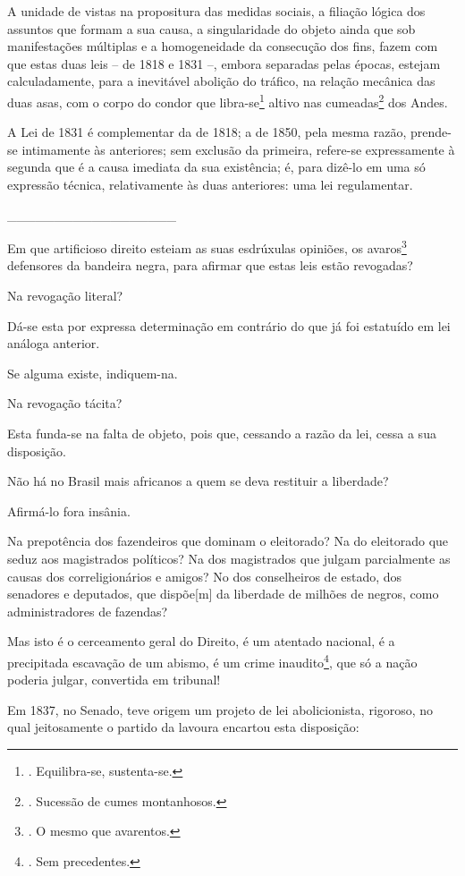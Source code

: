 A unidade de vistas na propositura das medidas sociais, a filiação
lógica dos assuntos que formam a sua causa, a singularidade do objeto
ainda que sob manifestações múltiplas e a homogeneidade da consecução
dos fins, fazem com que estas duas leis -- de 1818 e 1831 --, embora
separadas pelas épocas, estejam calculadamente, para a inevitável
abolição do tráfico, na relação mecânica das duas asas, com o corpo do
condor que libra-se\footnote{. Equilibra-se, sustenta-se.} altivo nas
cumeadas\footnote{. Sucessão de cumes montanhosos.} dos Andes.

A Lei de 1831 é complementar da de 1818; a de 1850, pela mesma razão,
prende-se intimamente às anteriores; sem exclusão da primeira, refere-se
expressamente à segunda que é a causa imediata da sua existência; é,
para dizê-lo em uma só expressão técnica, relativamente às duas
anteriores: uma lei regulamentar.

\_\_\_\_\_\_\_\_\_\_\_\_\_\_\_\_\_\_

Em que artificioso direito esteiam as suas esdrúxulas opiniões, os
avaros\footnote{. O mesmo que avarentos.} defensores da bandeira negra,
para afirmar que estas leis estão revogadas?

Na revogação literal?

Dá-se esta por expressa determinação em contrário do que já foi
estatuído em lei análoga anterior.

Se alguma existe, indiquem-na.

Na revogação tácita?

Esta funda-se na falta de objeto, pois que, cessando a razão da lei,
cessa a sua disposição.

Não há no Brasil mais africanos a quem se deva restituir a liberdade?

Afirmá-lo fora insânia.

Na prepotência dos fazendeiros que dominam o eleitorado? Na do
eleitorado que seduz aos magistrados políticos? Na dos magistrados que
julgam parcialmente as causas dos correligionários e amigos? No dos
conselheiros de estado, dos senadores e deputados, que dispõe{[}m{]} da
liberdade de milhões de negros, como administradores de fazendas?

Mas isto é o cerceamento geral do Direito, é um atentado nacional, é a
precipitada escavação de um abismo, é um crime inaudito\footnote{. Sem
  precedentes.}, que só a nação poderia julgar, convertida em tribunal!

Em 1837, no Senado, teve origem um projeto de lei abolicionista,
rigoroso, no qual jeitosamente o partido da lavoura encartou esta
disposição:

